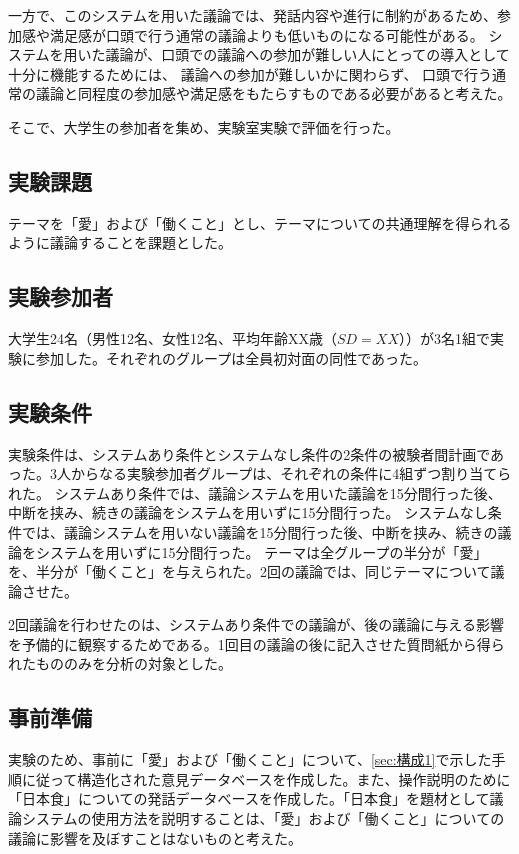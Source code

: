 \documentclass[11pt, a4paper]{jreport} %
\begin{document}
一方で、このシステムを用いた議論では、発話内容や進行に制約があるため、参加感や満足感が口頭で行う通常の議論よりも低いものになる可能性がある。
システムを用いた議論が、口頭での議論への参加が難しい人にとっての導入として十分に機能するためには、
議論への参加が難しいかに関わらず、
口頭で行う通常の議論と同程度の参加感や満足感をもたらすものである必要があると考えた。

そこで、大学生の参加者を集め、実験室実験で評価を行った。

\subsection{実験課題}
テーマを「愛」および「働くこと」とし、テーマについての共通理解を得られるように議論することを課題とした。


\subsection{実験参加者}
大学生24名（男性12名、女性12名、平均年齢XX歳（$SD=XX$））が3名1組で実験に参加した。それぞれのグループは全員初対面の同性であった。

\subsection{実験条件}
実験条件は、システムあり条件とシステムなし条件の2条件の被験者間計画であった。3人からなる実験参加者グループは、それぞれの条件に4組ずつ割り当てられた。
システムあり条件では、議論システムを用いた議論を15分間行った後、中断を挟み、続きの議論をシステムを用いずに15分間行った。
システムなし条件では、議論システムを用いない議論を15分間行った後、中断を挟み、続きの議論をシステムを用いずに15分間行った。
テーマは全グループの半分が「愛」を、半分が「働くこと」を与えられた。2回の議論では、同じテーマについて議論させた。


2回議論を行わせたのは、システムあり条件での議論が、後の議論に与える影響を予備的に観察するためである。1回目の議論の後に記入させた質問紙から得られたもののみを分析の対象とした。

\subsection{事前準備}
実験のため、事前に「愛」および「働くこと」について、\ref{sec:構成1}で示した手順に従って構造化された意見データベースを作成した。また、操作説明のために「日本食」についての発話データべースを作成した。「日本食」を題材として議論システムの使用方法を説明することは、「愛」および「働くこと」についての議論に影響を及ぼすことはないものと考えた。
\end{document}
